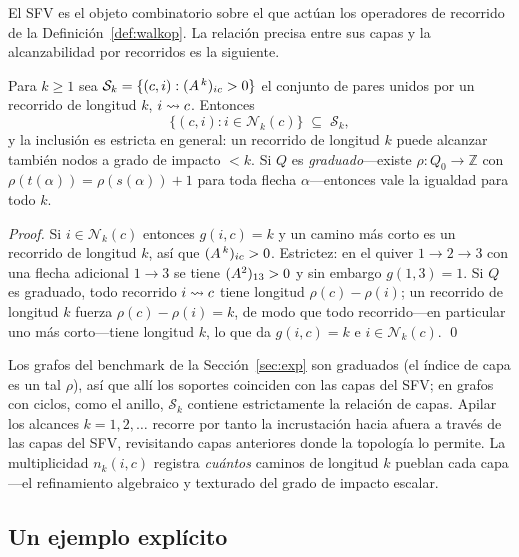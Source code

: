 El SFV es el objeto combinatorio sobre el que actúan los operadores de recorrido
de la Definición~\ref{def:walkop}. La relación precisa entre sus capas y la
alcanzabilidad por recorridos es la siguiente.

\begin{proposition}
\label{prop:fns}
Para $k\ge1$ sea $\mathcal{S}_k=\{(c,i):(A^{\,k})_{ic}>0\}$ el conjunto de
pares unidos por un recorrido de longitud $k$, $i\rightsquigarrow c$. Entonces
\[
  \{(c,i): i\in \mathcal{N}_k(c)\} \;\subseteq\; \mathcal{S}_k ,
\]
y la inclusión es estricta en general: un recorrido de longitud $k$ puede
alcanzar también nodos a grado de impacto $<k$. Si $Q$ es \emph{graduado}---existe
$\rho\colon Q_0\to\mathbb{Z}$ con $\rho(t(\alpha))=\rho(s(\alpha))+1$ para toda
flecha $\alpha$---entonces vale la igualdad para todo $k$.
\end{proposition}

\begin{proof}
Si $i\in\mathcal{N}_k(c)$ entonces $g(i,c)=k$ y un camino más corto es un
recorrido de longitud $k$, así que $(A^{\,k})_{ic}>0$. Estrictez: en el
quiver $1\to2\to3$ con una flecha adicional $1\to3$ se tiene
$(A^{2})_{13}>0$ y sin embargo $g(1,3)=1$. Si $Q$ es graduado, todo
recorrido $i\rightsquigarrow c$ tiene longitud $\rho(c)-\rho(i)$; un recorrido de longitud
$k$ fuerza $\rho(c)-\rho(i)=k$, de modo que todo recorrido---en particular uno
más corto---tiene longitud $k$, lo que da $g(i,c)=k$ e
$i\in\mathcal{N}_k(c)$. \qed
\end{proof}

Los grafos del benchmark de la Sección~\ref{sec:exp} son graduados (el índice de
capa es un tal $\rho$), así que allí los soportes coinciden con las capas del
SFV; en grafos con ciclos, como el anillo, $\mathcal{S}_k$ contiene
estrictamente la relación de capas. Apilar los alcances $k=1,2,\dots$ recorre
por tanto la incrustación hacia afuera a través de las capas del SFV,
revisitando capas anteriores donde la topología lo permite. La multiplicidad
$n_k(i,c)$ registra \emph{cuántos} caminos de longitud $k$ pueblan cada
capa---el refinamiento algebraico y texturado del grado de impacto escalar.

\subsection{Un ejemplo explícito}

